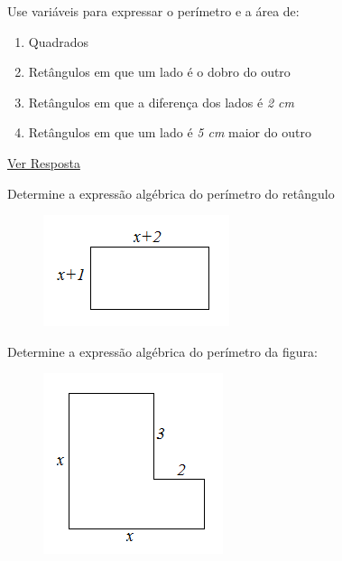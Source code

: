 \settowidth{}
\begin{description}[leftmargin=\dimexpr\widest+\labelsep\relax,labelindent=0pt,
    labelwidth=\widest]

\label{e:3.1.1}
\item[\thesubsection.\theexercicio]
Use variáveis para expressar o perímetro e a área de:
\begin{enumerate}[label=(\textbf{\alph*)}]
\item Quadrados
\item Retângulos em que um lado é o dobro do outro
\item Retângulos em que a diferença dos lados é \textit{2 cm}
\item Retângulos em que um lado é \textit{5 cm} maior do outro
\end{enumerate}

\hyperref[r:3.1.1]{Ver Resposta}

\item[\thesubsection.\theexercicio]
Determine a expressão algébrica do perímetro do retângulo
\begin{figure}[h]
  \includegraphics{capitulos/expressoes_algebricas/media/image3.png}
  \centering
\end{figure}

\item[\thesubsection.\theexercicio]
Determine a expressão algébrica do perímetro da figura:
\begin{figure}[h]
  \includegraphics{capitulos/expressoes_algebricas/media/image4.png}
  \centering
\end{figure}


\end{description}
